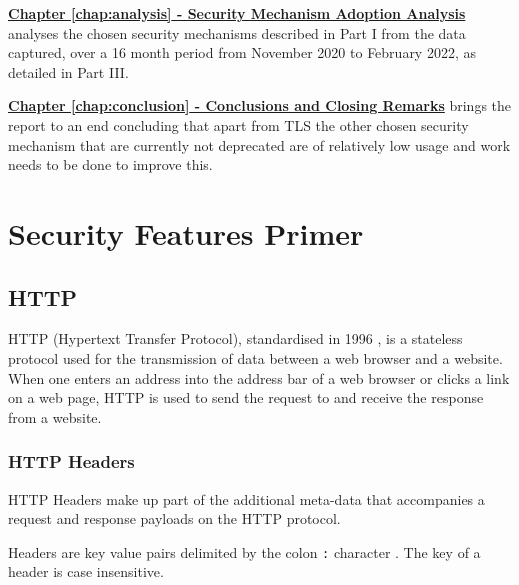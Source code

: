 \documentclass{mscreport}
\begin{document}
\vspace{0.3cm} \noindent
\hyperref[chap:analysis]{\textbf{Chapter \ref{chap:analysis} - Security Mechanism Adoption Analysis}} analyses the chosen security mechanisms described in Part I from the data captured, over a 16 month period from November 2020 to February 2022, as detailed in Part III.

\vspace{0.3cm} \noindent
\hyperref[chap:conclusion]{\textbf{Chapter \ref{chap:conclusion} - Conclusions and Closing Remarks}} brings the report to an end concluding that apart from TLS the other chosen security mechanism that are currently not deprecated are of relatively low usage and work needs to be done to improve this.

\newpage

%

\chapter{Security Features Primer}
\label{chap:sec_feat_primer}

\section{HTTP}
\label{section:http}

HTTP (Hypertext Transfer Protocol), standardised in 1996 \cite{Berners-Lee1996-ji}, is a stateless protocol used for the transmission of data between a web browser and a website. When one enters an address into the address bar of a web browser or clicks a link on a web page, HTTP is used to send the request to and receive the response from a website.

\subsection{HTTP Headers}

\noindent HTTP Headers make up part of the additional meta-data that accompanies a request and response payloads on the HTTP protocol.

\vspace{0.3cm} \noindent
Headers are key value pairs delimited by the colon \texttt{:} character \cite{Berners-Lee1996-ji}. The key of a header is case insensitive.
\end{document}
